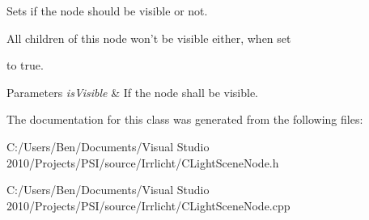 Sets if the node should be visible or not. 

\begin{DoxyVerb}All children of this node won't be visible either, when set
\end{DoxyVerb}
 to true. 
\begin{DoxyParams}{Parameters}
{\em is\-Visible} & If the node shall be visible. \\
\hline
\end{DoxyParams}


The documentation for this class was generated from the following files\-:\begin{DoxyCompactItemize}
\item 
C\-:/\-Users/\-Ben/\-Documents/\-Visual Studio 2010/\-Projects/\-P\-S\-I/source/\-Irrlicht/C\-Light\-Scene\-Node.\-h\item 
C\-:/\-Users/\-Ben/\-Documents/\-Visual Studio 2010/\-Projects/\-P\-S\-I/source/\-Irrlicht/C\-Light\-Scene\-Node.\-cpp\end{DoxyCompactItemize}
